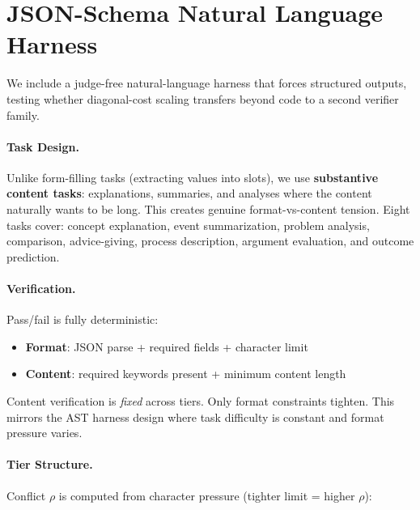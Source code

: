 \documentclass{article}
\theoremstyle{plain}
\theoremstyle{definition}
\theoremstyle{remark}
\begin{document}
\section{JSON-Schema Natural Language Harness}\label{app:json_harness}

We include a judge-free natural-language harness that forces structured outputs, testing whether diagonal-cost scaling transfers beyond code to a second verifier family.

\paragraph{Task Design.}
Unlike form-filling tasks (extracting values into slots), we use \textbf{substantive content tasks}: explanations, summaries, and analyses where the content naturally wants to be long. This creates genuine format-vs-content tension. Eight tasks cover: concept explanation, event summarization, problem analysis, comparison, advice-giving, process description, argument evaluation, and outcome prediction.

\paragraph{Verification.}
Pass/fail is fully deterministic:
\begin{itemize}
    \item \textbf{Format}: JSON parse + required fields + character limit
    \item \textbf{Content}: required keywords present + minimum content length
\end{itemize}
Content verification is \emph{fixed} across tiers. Only format constraints tighten. This mirrors the AST harness design where task difficulty is constant and format pressure varies.

\paragraph{Tier Structure.}
Conflict $\rho$ is computed from character pressure (tighter limit = higher $\rho$):

\begin{table}[ht]
\centering
\small
\caption{JSON-NL transfer results (Qwen-1.5B, $n=40$ per tier). Failure rate scales monotonically with $\rho$: 77.5\% $\to$ 90.0\% $\to$ 97.5\% $\to$ 100\%. Format is the binding constraint (Format\% drops from 50\% to 0\%), while content difficulty stays constant (~35--50\%).}
\label{tab:json_nl}
\end{table}
\end{document}
